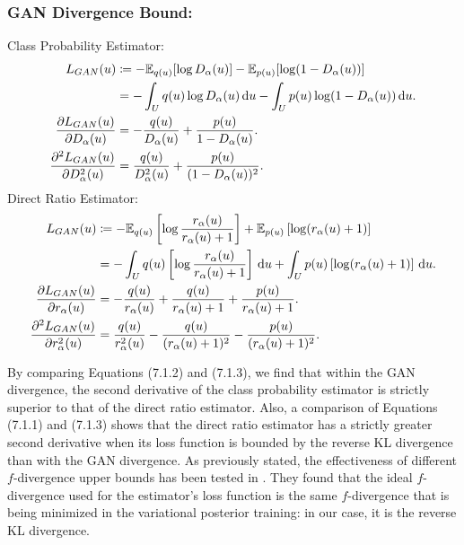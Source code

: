 \documentclass[honours,12pt, twoside]{unswthesis}
\newcommand{\E}{\mathbb{E}}
\numberwithin{equation}{section}
\theoremstyle{definition}
\begin{document}
\subsubsection*{\textbf{GAN Divergence Bound}:}
Class Probability Estimator:
\begin{align}
L_{GAN}(u)&\coloneqq-\E_{q(u)}[\log D_\alpha(u)]-\E_{p(u)}[\log (1-D_\alpha(u))]\nonumber\\
&=-\int_U q(u)\log D_\alpha(u) \,{\rm d}u -\int_U p(u)\log(1-D_\alpha(u))\,{\rm d}u.\nonumber\\
\frac{\partial L_{GAN}(u)}{\partial D_\alpha(u)}&=-\frac{q(u)}{D_\alpha(u)}+\frac{p(u)}{1-D_\alpha(u)}.\nonumber\\
\frac{\partial^2L_{GAN}(u)}{\partial D_\alpha^2(u)}&=\frac{q(u)}{D_\alpha^2(u)}+\frac{p(u)}{(1-D_\alpha(u))^2}.
\end{align}
Direct Ratio Estimator:
\begin{align}
L_{GAN}(u)&\coloneqq-\E_{q(u)}\left[\log \frac{r_\alpha(u)}{r_\alpha(u)+1}\right]+\E_{p(u)}\left[\log(r_\alpha(u)+1)\right]\nonumber\\
&=-\int_U q(u)\left[\log \frac{r_\alpha(u)}{r_\alpha(u)+1}\right]\,{\rm d}u+\int_U p(u)\left[\log(r_\alpha(u)+1)\right]\,{\rm d}u.\nonumber\\
\frac{\partial L_{GAN}(u)}{\partial r_\alpha(u)}&=-\frac{q(u)}{r_\alpha(u)}+\frac{q(u)}{r_\alpha(u)+1}+\frac{p(u)}{r_\alpha(u)+1}.\nonumber\\
\frac{\partial^2L_{GAN}(u)}{\partial r_\alpha^2(u)}&=\frac{q(u)}{r_\alpha^2(u)}-\frac{q(u)}{(r_\alpha(u)+1)^2}-\frac{p(u)}{(r_\alpha(u)+1)^2}.
\end{align}

By comparing Equations (7.1.2) and (7.1.3), we find that within the GAN divergence, the second derivative of the class probability estimator is strictly superior to that of the direct ratio estimator. Also, a comparison of Equations (7.1.1) and (7.1.3) shows that the direct ratio estimator has a strictly greater second derivative when its loss function is bounded by the reverse KL divergence than with the GAN divergence.
As previously stated, the effectiveness of different $f$-divergence upper bounds has been tested in \citet{nowozin}. They found that the ideal $f$-divergence used for the estimator's loss function is the same $f$-divergence that is being minimized in the variational posterior training: in our case, it is the reverse KL divergence.
\end{document}
